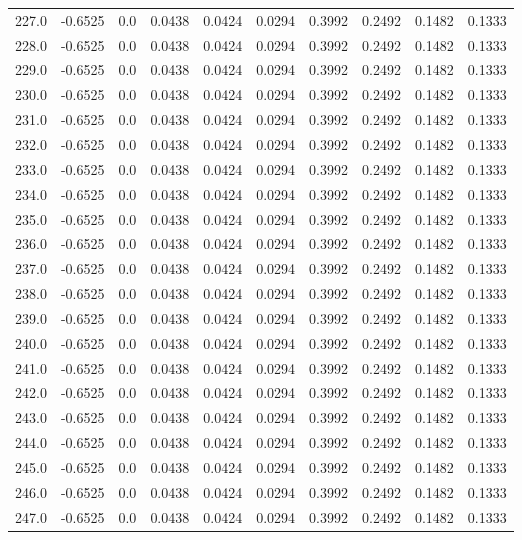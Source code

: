 \begin{longtable}{lrrrrrrrrr}
227.0 & -0.6525 & 0.0 & 0.0438 & 0.0424 & 0.0294 & 0.3992 & 0.2492 & 0.1482 & 0.1333 \\
228.0 & -0.6525 & 0.0 & 0.0438 & 0.0424 & 0.0294 & 0.3992 & 0.2492 & 0.1482 & 0.1333 \\
229.0 & -0.6525 & 0.0 & 0.0438 & 0.0424 & 0.0294 & 0.3992 & 0.2492 & 0.1482 & 0.1333 \\
230.0 & -0.6525 & 0.0 & 0.0438 & 0.0424 & 0.0294 & 0.3992 & 0.2492 & 0.1482 & 0.1333 \\
231.0 & -0.6525 & 0.0 & 0.0438 & 0.0424 & 0.0294 & 0.3992 & 0.2492 & 0.1482 & 0.1333 \\
232.0 & -0.6525 & 0.0 & 0.0438 & 0.0424 & 0.0294 & 0.3992 & 0.2492 & 0.1482 & 0.1333 \\
233.0 & -0.6525 & 0.0 & 0.0438 & 0.0424 & 0.0294 & 0.3992 & 0.2492 & 0.1482 & 0.1333 \\
234.0 & -0.6525 & 0.0 & 0.0438 & 0.0424 & 0.0294 & 0.3992 & 0.2492 & 0.1482 & 0.1333 \\
235.0 & -0.6525 & 0.0 & 0.0438 & 0.0424 & 0.0294 & 0.3992 & 0.2492 & 0.1482 & 0.1333 \\
236.0 & -0.6525 & 0.0 & 0.0438 & 0.0424 & 0.0294 & 0.3992 & 0.2492 & 0.1482 & 0.1333 \\
237.0 & -0.6525 & 0.0 & 0.0438 & 0.0424 & 0.0294 & 0.3992 & 0.2492 & 0.1482 & 0.1333 \\
238.0 & -0.6525 & 0.0 & 0.0438 & 0.0424 & 0.0294 & 0.3992 & 0.2492 & 0.1482 & 0.1333 \\
239.0 & -0.6525 & 0.0 & 0.0438 & 0.0424 & 0.0294 & 0.3992 & 0.2492 & 0.1482 & 0.1333 \\
240.0 & -0.6525 & 0.0 & 0.0438 & 0.0424 & 0.0294 & 0.3992 & 0.2492 & 0.1482 & 0.1333 \\
241.0 & -0.6525 & 0.0 & 0.0438 & 0.0424 & 0.0294 & 0.3992 & 0.2492 & 0.1482 & 0.1333 \\
242.0 & -0.6525 & 0.0 & 0.0438 & 0.0424 & 0.0294 & 0.3992 & 0.2492 & 0.1482 & 0.1333 \\
243.0 & -0.6525 & 0.0 & 0.0438 & 0.0424 & 0.0294 & 0.3992 & 0.2492 & 0.1482 & 0.1333 \\
244.0 & -0.6525 & 0.0 & 0.0438 & 0.0424 & 0.0294 & 0.3992 & 0.2492 & 0.1482 & 0.1333 \\
245.0 & -0.6525 & 0.0 & 0.0438 & 0.0424 & 0.0294 & 0.3992 & 0.2492 & 0.1482 & 0.1333 \\
246.0 & -0.6525 & 0.0 & 0.0438 & 0.0424 & 0.0294 & 0.3992 & 0.2492 & 0.1482 & 0.1333 \\
247.0 & -0.6525 & 0.0 & 0.0438 & 0.0424 & 0.0294 & 0.3992 & 0.2492 & 0.1482 & 0.1333 \\

\end{longtable}
